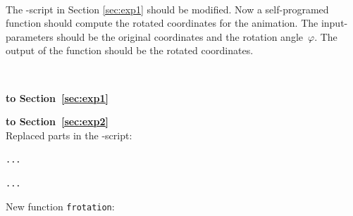 $\phantom{x}$

The \matl -script in Section \ref{sec:exp1} should be modified.
Now a self-programed function should compute the rotated coordinates
for the animation. The input-parameters should be the
original coordinates and the rotation angle~$\varphi$. The output of the
function should be the rotated coordinates.

\clearpage
{}
$\phantom{x}$

{\bf to Section~\ref{sec:exp1}}\\[-6ex]
\begin{alltt}
\small

\end{alltt}

\vspace*{-0.5cm}
{\bf to Section~\ref{sec:exp2}}\smallskip\\
Replaced parts in the \matl -script:
\vspace*{-1cm}
\begin{alltt}
\small
...

...
\end{alltt}


\vspace*{-0.1cm}
New function \verb/frotation/:
\vspace*{-0.9cm}
\begin{alltt}
\small

\end{alltt}

